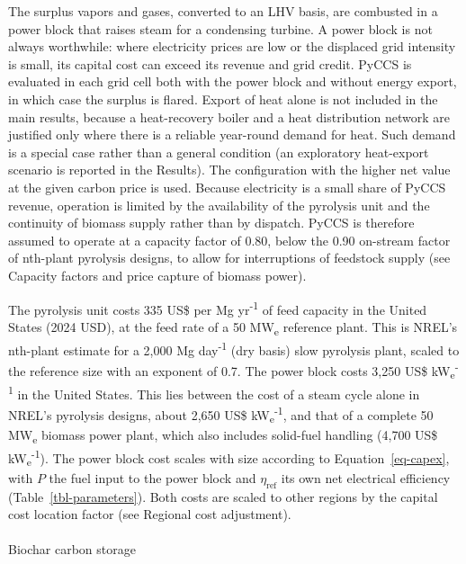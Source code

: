 \documentclass[
  letterpaper,
  twoside,
  twocolumn,
  9pt]{article}
\makeatletter
\let\oldparagraph\paragraph
\renewcommand{\paragraph}{
    \@ifstar
      \xxxParagraphStar
      \xxxParagraphNoStar
  }
\newcommand{\xxxParagraphStar}[1]{\oldparagraph*{#1}\mbox{}}
\newcommand{\xxxParagraphNoStar}[1]{\oldparagraph{#1}\mbox{}}
\makeatother
\begin{document}
The surplus vapors and gases, converted to an LHV basis, are combusted
in a power block that raises steam for a condensing turbine. A power
block is not always worthwhile: where electricity prices are low or the
displaced grid intensity is small, its capital cost can exceed its
revenue and grid credit. PyCCS is evaluated in each grid cell both with
the power block and without energy export, in which case the surplus is
flared. Export of heat alone is not included in the main results,
because a heat-recovery boiler and a heat distribution network are
justified only where there is a reliable year-round demand for heat.
Such demand is a special case rather than a general condition (an
exploratory heat-export scenario is reported in the Results). The
configuration with the higher net value at the given carbon price is
used. Because electricity is a small share of PyCCS revenue, operation
is limited by the availability of the pyrolysis unit and the continuity
of biomass supply rather than by dispatch. PyCCS is therefore assumed to
operate at a capacity factor of 0.80, below the 0.90 on-stream factor of
nth-plant pyrolysis designs,\citep{dutta2015} to allow for interruptions
of feedstock supply (see Capacity factors and price capture of biomass
power).

The pyrolysis unit costs 335 US\$ per Mg yr\textsuperscript{-1} of feed
capacity in the United States (2024 USD), at the feed rate of a 50
MW\textsubscript{e} reference plant. This is NREL's nth-plant estimate
for a 2,000 Mg day\textsuperscript{-1} (dry basis) slow pyrolysis
plant,\citep{yadav2026} scaled to the reference size with an exponent of
0.7. The power block costs 3,250 US\$
kW\textsubscript{e}\textsuperscript{-1} in the United States. This lies
between the cost of a steam cycle alone in NREL's pyrolysis designs,
about 2,650 US\$
kW\textsubscript{e}\textsuperscript{-1},\citep{dutta2015} and that of a
complete 50 MW\textsubscript{e} biomass power plant,\citep{eia2026}
which also includes solid-fuel handling (4,700 US\$
kW\textsubscript{e}\textsuperscript{-1}). The power block cost scales
with size according to Equation~\ref{eq-capex}, with \(P\) the fuel
input to the power block and \(\eta_{\mathrm{ref}}\) its own net
electrical efficiency (Table~\ref{tbl-parameters}). Both costs are
scaled to other regions by the capital cost location factor (see
Regional cost adjustment).

\paragraph{Biochar carbon storage}\label{biochar-carbon-storage}
\end{document}
